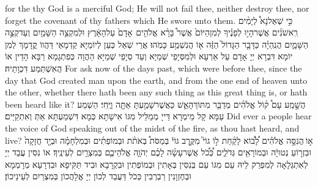 {for the \lord\space thy God is a merciful God; He will not fail thee, neither destroy thee, nor forget the covenant of thy fathers which He swore unto them.}{}
{כִּ֣י שְׁאַל\maqqaf נָא֩ לְיָמִ֨ים רִֽאשֹׁנִ֜ים אֲשֶׁר\maqqaf הָי֣וּ לְפָנֶ֗יךָ לְמִן\maqqaf הַיּוֹם֙ אֲשֶׁר֩ בָּרָ֨א אֱלֹהִ֤ים \pasek  אָדָם֙ עַל\maqqaf הָאָ֔רֶץ וּלְמִקְצֵ֥ה הַשָּׁמַ֖יִם וְעַד\maqqaf קְצֵ֣ה הַשָּׁמָ֑יִם הֲנִֽהְיָ֗ה כַּדָּבָ֤ר הַגָּדוֹל֙ הַזֶּ֔ה א֖וֹ הֲנִשְׁמַ֥ע כָּמֹֽהוּ׃}
{אֲרֵי שְׁאַל כְּעַן לְיוֹמַיָּא קַדְמָאֵי דַּהֲווֹ קֳדָמָךְ לְמִן יוֹמָא דִּבְרָא יְיָ אָדָם עַל אַרְעָא וּלְמִסְּיָפֵי שְׁמַיָּא וְעַד סְיָפֵי שְׁמַיָּא הַהֲוָה כְּפִתְגָמָא רַבָּא הָדֵין אוֹ הֲאִשְׁתְּמַע דִּכְוָתֵיהּ׃}
{For ask now of the days past, which were before thee, since the day that God created man upon the earth, and from the one end of heaven unto the other, whether there hath been any such thing as this great thing is, or hath been heard like it?}{}
{הֲשָׁ֣מַֽע עָם֩ ק֨וֹל אֱלֹהִ֜ים מְדַבֵּ֧ר מִתּוֹךְ\maqqaf הָאֵ֛שׁ כַּאֲשֶׁר\maqqaf שָׁמַ֥עְתָּ אַתָּ֖ה וַיֶּֽחִי׃}
{הַשְׁמַע עַמָּא קָל מֵימְרָא דַּייָ מְמַלֵּיל מִגּוֹ אִישָׁתָא כְּמָא דִּשְׁמַעְתָּא אַתְּ וְאִתְקַיַּים׃}
{Did ever a people hear the voice of God speaking out of the midst of the fire, as thou hast heard, and live?}{}
{א֣וֹ \legarmeh  הֲנִסָּ֣ה אֱלֹהִ֗ים לָ֠ב֠וֹא לָקַ֨חַת ל֣וֹ גוֹי֮ מִקֶּ֣רֶב גּוֹי֒ בְּמַסֹּת֩ בְּאֹתֹ֨ת וּבְמוֹפְתִ֜ים וּבְמִלְחָמָ֗ה וּבְיָ֤ד חֲזָקָה֙ וּבִזְר֣וֹעַ נְטוּיָ֔ה וּבְמוֹרָאִ֖ים גְּדֹלִ֑ים כְּ֠כֹ֠ל אֲשֶׁר\maqqaf עָשָׂ֨ה לָכֶ֜ם יְהֹוָ֧ה אֱלֹהֵיכֶ֛ם בְּמִצְרַ֖יִם לְעֵינֶֽיךָ׃}
{אוֹ נִסִּין עֲבַד יְיָ לְאִתְגְּלָאָה לְמִפְרַק לֵיהּ עַם מִגּוֹ עַם בְּנִסִּין בְּאָתִין וּבְמוֹפְתִין וּבִקְרָבָא וּבִיד תַּקִּיפָא וּבִדְרָעָא מְרָמְמָא וּבְחֶזְוָנִין רַבְרְבִין כְּכֹל דַּעֲבַד לְכוֹן יְיָ אֱלָהֲכוֹן בְּמִצְרַיִם לְעֵינֵיכוֹן׃}
